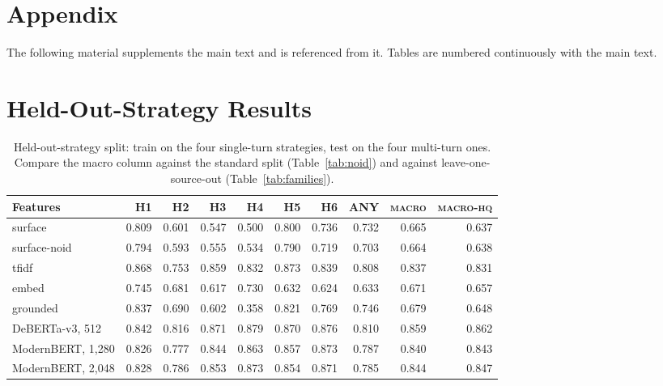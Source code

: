 \appendix
\raggedbottom
\section*{Appendix}

The following material supplements the main text and is referenced from it.
Tables are numbered continuously with the main text.


\section{Held-Out-Strategy Results}
\label{app:strategy}

\begin{table}[H]
\caption{Held-out-strategy split: train on the four single-turn strategies,
test on the four multi-turn ones. Compare the macro column against the standard
split (Table~\ref{tab:noid}) and against leave-one-source-out
(Table~\ref{tab:families}).}
\label{tab:strategy}
\centering\footnotesize
\setlength{\tabcolsep}{4pt}
\begin{tabular}{lrrrrrrrrr}
\toprule
Features & H1 & H2 & H3 & H4 & H5 & H6 & ANY & \textsc{macro} & \textsc{macro-hq} \\
\midrule
surface             & 0.809 & 0.601 & 0.547 & 0.500 & 0.800 & 0.736 & 0.732 & 0.665 & 0.637 \\
surface-noid        & 0.794 & 0.593 & 0.555 & 0.534 & 0.790 & 0.719 & 0.703 & 0.664 & 0.638 \\
tfidf               & 0.868 & 0.753 & 0.859 & 0.832 & 0.873 & 0.839 & 0.808 & 0.837 & 0.831 \\
embed               & 0.745 & 0.681 & 0.617 & 0.730 & 0.632 & 0.624 & 0.633 & 0.671 & 0.657 \\
grounded            & 0.837 & 0.690 & 0.602 & 0.358 & 0.821 & 0.769 & 0.746 & 0.679 & 0.648 \\
\midrule
DeBERTa-v3, 512     & 0.842 & 0.816 & 0.871 & 0.879 & 0.870 & 0.876 & 0.810 & 0.859 & 0.862 \\
ModernBERT, 1{,}280 & 0.826 & 0.777 & 0.844 & 0.863 & 0.857 & 0.873 & 0.787 & 0.840 & 0.843 \\
ModernBERT, 2{,}048 & 0.828 & 0.786 & 0.853 & 0.873 & 0.854 & 0.871 & 0.785 & 0.844 & 0.847 \\
\bottomrule
\end{tabular}
\end{table}

